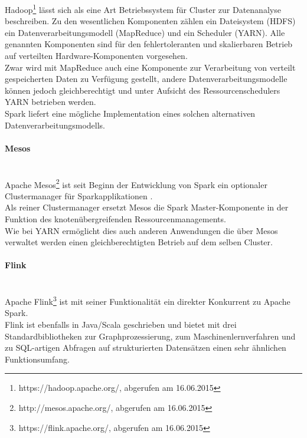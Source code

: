 Hadoop\footnote{https://hadoop.apache.org/, abgerufen am 16.06.2015} lässt sich als eine Art Betriebssystem für Cluster zur Datenanalyse beschreiben. Zu den wesentlichen Komponenten zählen ein Dateisystem (HDFS) ein Datenverarbeitungsmodell (MapReduce) und ein Scheduler (YARN).
Alle genannten Komponenten sind für den fehlertoleranten und skalierbaren Betrieb auf verteilten Hardware-Komponenten vorgesehen.\\

Zwar wird mit MapReduce auch eine Komponente zur Verarbeitung von verteilt gespeicherten Daten zu Verfügung gestellt, andere Datenverarbeitungsmodelle können jedoch gleichberechtigt und unter Aufsicht des Ressourcenschedulers YARN betrieben werden.\\

Spark liefert eine mögliche Implementation eines solchen alternativen Datenverarbeitungsmodells.

\paragraph{Mesos}\\

Apache Mesos\footnote{http://mesos.apache.org/, abgerufen am 16.06.2015} ist seit Beginn der Entwicklung von Spark ein optionaler Clustermanager für Sparkapplikationen \cite{Mat12}.\\

Als reiner Clustermanager ersetzt Mesos die Spark Master-Komponente in der Funktion des knotenübergreifenden Ressourcenmanagements.\\

Wie bei YARN ermöglicht dies auch anderen Anwendungen die über Mesos verwaltet werden einen gleichberechtigten Betrieb auf dem selben Cluster.\\

\paragraph{Flink}\\

Apache Flink\footnote{https://flink.apache.org/, abgerufen am 16.06.2015} ist mit seiner Funktionalität ein direkter Konkurrent zu Apache Spark.\\

Flink ist ebenfalls in Java/Scala geschrieben und bietet mit drei Standardbibliotheken zur Graphprozessierung, zum Maschinenlernverfahren und zu SQL-artigen Abfragen auf strukturierten Datensätzen einen sehr ähnlichen Funktionsumfang.\\

